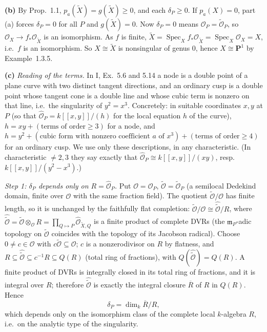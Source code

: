 \documentclass[11pt]{article}
\begin{document}
\textbf{(b)} By Prop.~1.1, $p_a(\widetilde X)=g(\widetilde X)\ge0$, and each $\delta_P\ge0$. If $p_a(X)=0$, part (a) forces $\delta_P=0$ for all $P$ and $g(\widetilde X)=0$. Now $\delta_P=0$ means $\mathcal O_P=\widetilde{\mathcal O}_P$, so $\mathcal O_X\to f_*\mathcal O_{\widetilde X}$ is an isomorphism. As $f$ is finite, $\widetilde X=\operatorname{Spec}_X f_*\mathcal O_{\widetilde X}=\operatorname{Spec}_X\mathcal O_X=X$, i.e.\ $f$ is an isomorphism. So $X\cong\widetilde X$ is nonsingular of genus $0$, hence $X\cong\mathbf P^1$ by Example~1.3.5.

\textbf{(c)} \emph{Reading of the terms.} In I, Ex.~5.6 and 5.14 a node is a double point of a plane curve with two distinct tangent directions, and an ordinary cusp is a double point whose tangent cone is a double line and whose cubic term is nonzero on that line, i.e.\ the singularity of $y^2=x^3$. Concretely: in suitable coordinates $x,y$ at $P$ (so that $\widehat{\mathcal O}_P=k[[x,y]]/(h)$ for the local equation $h$ of the curve), $h=xy+(\text{terms of order}\ge3)$ for a node, and $h=y^2+(\text{cubic form with nonzero coefficient }a\text{ of }x^3)+(\text{terms of order}\ge4)$ for an ordinary cusp. We use only these descriptions, in any characteristic. (In characteristic $\ne2,3$ they say exactly that $\widehat{\mathcal O}_P\cong k[[x,y]]/(xy)$, resp.\ $k[[x,y]]/(y^2-x^3)$.)

\emph{Step 1: $\delta_P$ depends only on $R=\widehat{\mathcal O}_P$.} Put $\mathcal O=\mathcal O_P$, $\widetilde{\mathcal O}=\widetilde{\mathcal O}_P$ (a semilocal Dedekind domain, finite over $\mathcal O$ with the same fraction field). The quotient $\widetilde{\mathcal O}/\mathcal O$ has finite length, so it is unchanged by the faithfully flat completion: $\widetilde{\mathcal O}/\mathcal O\cong\widehat{\widetilde{\mathcal O}}/R$, where $\widehat{\widetilde{\mathcal O}}=\widetilde{\mathcal O}\otimes_{\mathcal O}R=\prod_{Q\mapsto P}\widehat{\mathcal O}_{\widetilde X,Q}$ is a finite product of complete DVRs (the $\mathfrak m_P$-adic topology on $\widetilde{\mathcal O}$ coincides with the topology of its Jacobson radical). Choose $0\ne c\in\mathcal O$ with $c\widetilde{\mathcal O}\subseteq\mathcal O$; $c$ is a nonzerodivisor on $R$ by flatness, and $R\subseteq\widehat{\widetilde{\mathcal O}}\subseteq c^{-1}R\subseteq Q(R)$ (total ring of fractions), with $Q(\widehat{\widetilde{\mathcal O}})=Q(R)$. A finite product of DVRs is integrally closed in its total ring of fractions, and it is integral over $R$; therefore $\widehat{\widetilde{\mathcal O}}$ is exactly the integral closure $\overline R$ of $R$ in $Q(R)$. Hence
\[
\delta_P=\dim_k\overline R/R,
\]
which depends only on the isomorphism class of the complete local $k$-algebra $R$, i.e.\ on the analytic type of the singularity.
\end{document}
